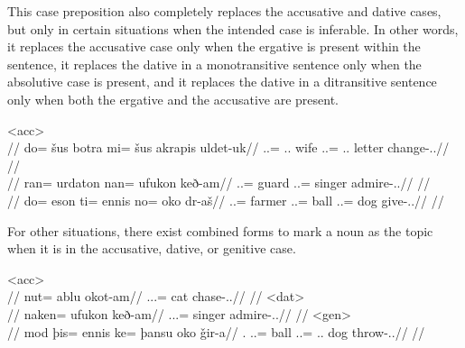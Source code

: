 This case preposition also completely replaces the accusative and dative cases, but only in certain situations when the intended case is inferable. In other words, it replaces the accusative case only when the ergative is present within the sentence, it replaces the dative in a monotransitive sentence only when the absolutive case is present, and it replaces the dative in a ditransitive sentence only when both the ergative and the accusative are present.

	\a<acc>\begingl
		\glpreamble{}\\
		//
		\gla do= šus botra mi= šus akrapis uldet-uk//
		\glb \An.\Sg.\Erg= \Tpp.\An.\Gen{} wife \In.\Sg.\Top= \Tpp.\An.\Gen{} letter change-\Ind.\Pst.\Pfv//
		\glft{}//
	\endgl
	\a<dat-st>\begingl
		\glpreamble{}\\
		//
		\gla ran= urdaton nan= ufukon keð-am//
		\glb \An.\Pl.\Abs= guard \An.\Pl.\Top= singer admire-\Ind.\Pst.\Ipfv//
		\glft{}//
	\endgl
	\a<dat-ac>\begingl
		\glpreamble{}\\
		//
		\gla do= eson ti= ennis no= oko dr-aš//
		\glb \An.\Sg.\Erg= farmer \In.\Sg.\Acc= ball \An.\Sg.\Top= dog give-\Ind.\Npst.\Rtsp//
		\glft{}//
	\endgl
\xe

For other situations, there exist combined forms to mark a noun as the topic when it is in the accusative, dative, or genitive case.

	\a<acc>\begingl
		\glpreamble{}\\
		//
		\gla nut= ablu okot-am//
		\glb \An.\Sg.\Acc.\Top= cat chase-\Ind.\Pst.\Ipfv//
		\glft{}//
	\endgl
	\a<dat>\begingl
		\glpreamble{}\\
		//
		\gla naken= ufukon keð-am//
		\glb \An.\Pl.\Dat.\Top= singer admire-\Ind.\Pst.\Ipfv//
		\glft{}//
	\endgl
	\a<gen>\begingl
		\glpreamble{}\\
		//
		\gla mod þis= ennis ke= þansu oko ǧir-a//
		\glb \Fps.\Erg{} \In.\Sg.\Acc= ball \An.\Sg.\Dat= \Sps.\Gen.\Top{} dog throw-\Ind.\Npst.\Ipfv//
		\glft{}//
	\endgl
\xe

